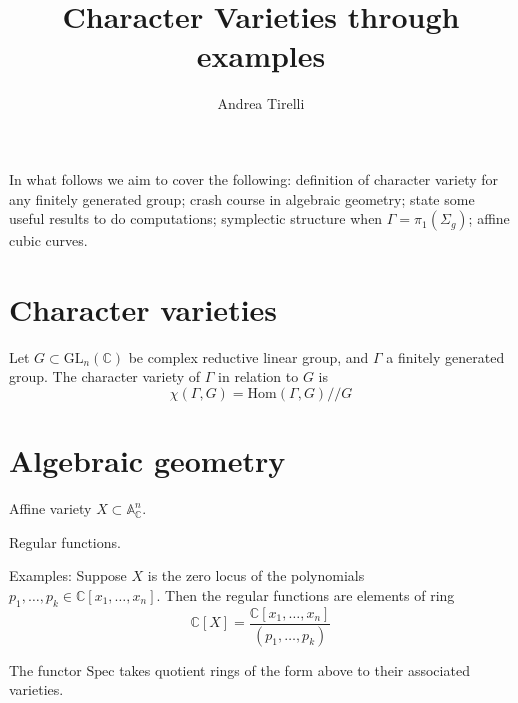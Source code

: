 
% 



\title{Character Varieties through examples}
\author{Andrea Tirelli}
\date{}

 
\maketitle

In what follows we aim to cover the following:
definition of character variety for any finitely generated group; 
crash course in algebraic geometry;
state some useful results to do computations; 
symplectic structure when $ \Gamma = \pi_1 ( \Sigma_g) $;
affine cubic curves.

\section{Character varieties} %

\begin{definition}
    Let $ G \subset \mathrm{GL}_n (\mathbb{C} ) $ be complex reductive linear group, 
    and $ \Gamma $ a finitely generated group. 
    The character variety of $ \Gamma$ in relation to $G$ is 
    \begin{equation}
        \chi ( \Gamma, G) = \mathrm{Hom}( \Gamma, G) // G 
    \end{equation}
\end{definition}


\section{Algebraic geometry} %

\begin{definition}
    Affine variety  $ X \subset \mathbb{A}_\mathbb{C} ^n $.
\end{definition}

\begin{definition}
    Regular functions. 
\end{definition}

Examples: 
Suppose $X$ is the zero locus of the polynomials $p_1, \dots, p_k \in \mathbb{C} [x_1, \dots, x_n ] $. 
Then the regular functions are elements of ring 
\begin{equation}
    \mathbb{C}  [X] = \frac{\mathbb{C} [x_1, \dots, x_n ] }{(p_1, \dots, p_k)}
\end{equation}

The functor $\mathrm{Spec} $ takes quotient rings of the form above to their associated varieties. 

